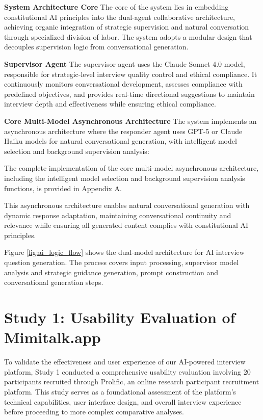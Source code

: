 \documentclass[sigchi,nonacm,manuscript]{acmart}
\begin{document}
\textbf{System Architecture Core}  
The core of the system lies in embedding constitutional AI principles into the dual-agent collaborative architecture, achieving organic integration of strategic supervision and natural conversation through specialized division of labor. The system adopts a modular design that decouples supervision logic from conversational generation.

\textbf{Supervisor Agent}  
The supervisor agent uses the Claude Sonnet 4.0 model, responsible for strategic-level interview quality control and ethical compliance. It continuously monitors conversational development, assesses compliance with predefined objectives, and provides real-time directional suggestions to maintain interview depth and effectiveness while ensuring ethical compliance.

\textbf{Core Multi-Model Asynchronous Architecture}  
The system implements an asynchronous architecture where the responder agent uses GPT-5 or Claude Haiku models for natural conversational generation, with intelligent model selection and background supervision analysis:

The complete implementation of the core multi-model asynchronous architecture, including the intelligent model selection and background supervision analysis functions, is provided in Appendix A.

This asynchronous architecture enables natural conversational generation with dynamic response adaptation, maintaining conversational continuity and relevance while ensuring all generated content complies with constitutional AI principles.

Figure \ref{fig:ai_logic_flow} shows the dual-model architecture for AI interview question generation. The process covers input processing, supervisor model analysis and strategic guidance generation, prompt construction and conversational generation steps.

\section{Study 1: Usability Evaluation of Mimitalk.app}

To validate the effectiveness and user experience of our AI-powered interview platform, Study 1 conducted a comprehensive usability evaluation involving 20 participants recruited through Prolific, an online research participant recruitment platform. This study serves as a foundational assessment of the platform's technical capabilities, user interface design, and overall interview experience before proceeding to more complex comparative analyses.
\end{document}
